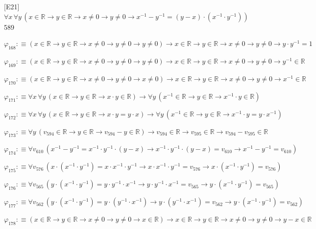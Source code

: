 \begin{fullproof}{[E21]}{$\forall x\,\forall y\,(x \in \mathbb{R} \to y \in \mathbb{R} \to x \neq 0 \to y \neq 0 \to x^{-1} - y^{-1} = (y - x) \cdot (x^{-1} \cdot y^{-1}))$}{589}
\begin{abbrevlist}
\item $\varphi_{168} :\equiv (x \in \mathbb{R} \to y \in \mathbb{R} \to x \neq 0 \to y \neq 0 \to y \neq 0) \to x \in \mathbb{R} \to y \in \mathbb{R} \to x \neq 0 \to y \neq 0 \to y \cdot y^{-1} = 1$
\item $\varphi_{169} :\equiv (x \in \mathbb{R} \to y \in \mathbb{R} \to x \neq 0 \to y \neq 0 \to y \neq 0) \to x \in \mathbb{R} \to y \in \mathbb{R} \to x \neq 0 \to y \neq 0 \to y^{-1} \in \mathbb{R}$
\item $\varphi_{170} :\equiv (x \in \mathbb{R} \to y \in \mathbb{R} \to x \neq 0 \to y \neq 0 \to x \neq 0) \to x \in \mathbb{R} \to y \in \mathbb{R} \to x \neq 0 \to y \neq 0 \to x^{-1} \in \mathbb{R}$
\item $\varphi_{171} :\equiv \forall x\,\forall y\,(x \in \mathbb{R} \to y \in \mathbb{R} \to x \cdot y \in \mathbb{R}) \to \forall y\,(x^{-1} \in \mathbb{R} \to y \in \mathbb{R} \to x^{-1} \cdot y \in \mathbb{R})$
\item $\varphi_{172} :\equiv \forall x\,\forall y\,(x \in \mathbb{R} \to y \in \mathbb{R} \to x \cdot y = y \cdot x) \to \forall y\,(x^{-1} \in \mathbb{R} \to y \in \mathbb{R} \to x^{-1} \cdot y = y \cdot x^{-1})$
\item $\varphi_{173} :\equiv \forall y\,(v_{594} \in \mathbb{R} \to y \in \mathbb{R} \to v_{594} - y \in \mathbb{R}) \to v_{594} \in \mathbb{R} \to v_{595} \in \mathbb{R} \to v_{594} - v_{595} \in \mathbb{R}$
\item $\varphi_{174} :\equiv \forall v_{610}\,(x^{-1} - y^{-1} = x^{-1} \cdot y^{-1} \cdot (y - x) \to x^{-1} \cdot y^{-1} \cdot (y - x) = v_{610} \to x^{-1} - y^{-1} = v_{610})$
\item $\varphi_{175} :\equiv \forall v_{576}\,(x \cdot (x^{-1} \cdot y^{-1}) = x \cdot x^{-1} \cdot y^{-1} \to x \cdot x^{-1} \cdot y^{-1} = v_{576} \to x \cdot (x^{-1} \cdot y^{-1}) = v_{576})$
\item $\varphi_{176} :\equiv \forall v_{565}\,(y \cdot (x^{-1} \cdot y^{-1}) = y \cdot y^{-1} \cdot x^{-1} \to y \cdot y^{-1} \cdot x^{-1} = v_{565} \to y \cdot (x^{-1} \cdot y^{-1}) = v_{565})$
\item $\varphi_{177} :\equiv \forall v_{562}\,(y \cdot (x^{-1} \cdot y^{-1}) = y \cdot (y^{-1} \cdot x^{-1}) \to y \cdot (y^{-1} \cdot x^{-1}) = v_{562} \to y \cdot (x^{-1} \cdot y^{-1}) = v_{562})$
\item $\varphi_{178} :\equiv (x \in \mathbb{R} \to y \in \mathbb{R} \to x \neq 0 \to y \neq 0 \to x \in \mathbb{R}) \to x \in \mathbb{R} \to y \in \mathbb{R} \to x \neq 0 \to y \neq 0 \to y - x \in \mathbb{R}$

\end{abbrevlist}
\end{fullproof}
